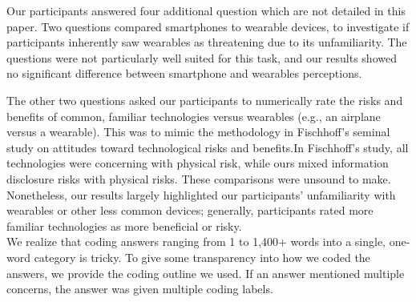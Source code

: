 \label{sec:noquestions}
Our participants answered four additional question which are not detailed in this paper. Two questions compared smartphones to wearable devices, to investigate if participants inherently saw wearables as threatening due to its unfamiliarity. The questions were not particularly well suited for this task, and our results showed no significant difference between smartphone and wearables perceptions. 

The other two questions asked our participants to numerically rate the risks and benefits of common, familiar technologies versus wearables (e.g., an airplane versus a wearable). This was to mimic the methodology in Fischhoff's seminal study on attitudes toward technological risks and benefits.In Fischhoff's study, all technologies were concerning with physical risk, while ours mixed information disclosure risks with physical risks. These comparisons were unsound to make. Nonetheless, our results largely highlighted our participants' unfamiliarity with wearables or other less common devices; generally, participants rated more familiar technologies as more beneficial or risky. \\


\label{sec:coding}
We realize that coding answers ranging from 1 to 1,400+ words into a single, one-word category is tricky. To give some transparency into how we coded the answers, we provide the coding outline we used. If an answer mentioned multiple concerns, the answer was given multiple coding labels. \\

